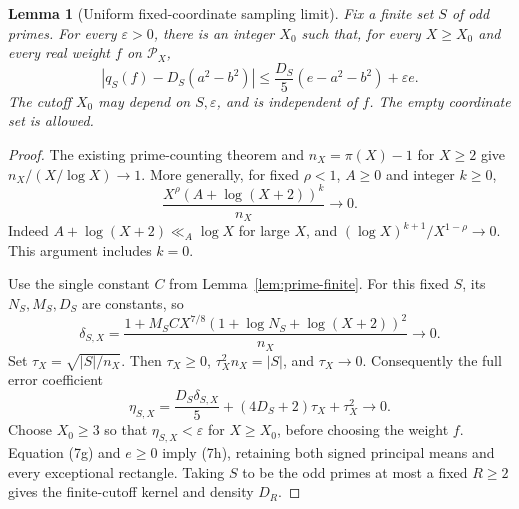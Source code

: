 \documentclass[11pt]{article}
\newtheorem{lemma}{Lemma}
\newcommand{\Pcal}{\mathcal P}
\begin{document}
\begin{lemma}[Uniform fixed-coordinate sampling limit]\label{lem:prime-limit}
Fix a finite set \(S\) of odd primes. For every \(\varepsilon>0\),
there is an integer \(X_0\) such that, for every \(X\ge X_0\) and
every real weight \(f\) on \(\Pcal_X\),
\[
 |q_S(f)-D_S(a^2-b^2)|
 \le \frac{D_S}{5}(e-a^2-b^2)+\varepsilon e.                \tag{7h}
\]
The cutoff \(X_0\) may depend on \(S,\varepsilon\), and is independent
of \(f\). The empty coordinate set is allowed.
\end{lemma}
\begin{proof}
The existing prime-counting theorem and \(n_X=\pi(X)-1\) for \(X\ge2\)
give \(n_X/(X/\log X)\to1\).
More generally, for fixed \(\rho<1\), \(A\ge0\) and integer \(k\ge0\),
\[
 \frac{X^\rho(A+\log(X+2))^k}{n_X}\longrightarrow0.
\]
Indeed \(A+\log(X+2)\ll_A\log X\) for large \(X\), and
\((\log X)^{k+1}/X^{1-\rho}\to0\). This argument includes \(k=0\).

Use the single constant \(C\) from Lemma~\ref{lem:prime-finite}.
For this fixed \(S\), its \(N_S,M_S,D_S\) are constants, so
\[
 \delta_{S,X}
 =\frac{1+M_SCX^{7/8}(1+\log N_S+\log(X+2))^2}{n_X}
 \longrightarrow0.
\]
Set \(\tau_X=\sqrt{|S|/n_X}\). Then \(\tau_X\ge0\),
\(\tau_X^2n_X=|S|\), and \(\tau_X\to0\).
Consequently the full error coefficient
\[
 \eta_{S,X}=\frac{D_S\delta_{S,X}}5
             +(4D_S+2)\tau_X+\tau_X^2
 \longrightarrow0.
\]
Choose \(X_0\ge3\) so that \(\eta_{S,X}<\varepsilon\) for
\(X\ge X_0\), before choosing the weight \(f\).
Equation (7g) and \(e\ge0\) imply (7h), retaining both signed
principal means and every exceptional rectangle.
Taking \(S\) to be the odd primes at most a fixed \(R\ge2\)
gives the finite-cutoff kernel and density \(D_R\).
\end{proof}
\end{document}
